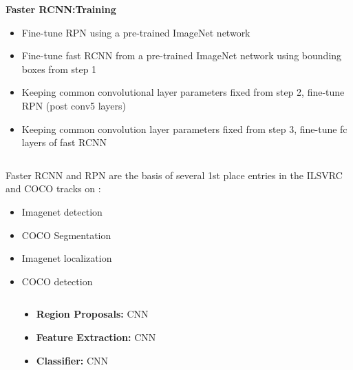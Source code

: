 \begin{frame}{}
	\begin{columns}
		
		\begin{overlayarea}{\textwidth}{\textheight}
			{\bf{\onslide<1->Faster RCNN:Training}}
			\begin{itemize}
				\justifying
				\item<2-> Fine-tune RPN using a pre-trained ImageNet network
				\item<3-> Fine-tune fast RCNN from a pre-trained ImageNet network using bounding boxes from step 1
				\item<4-> Keeping common convolutional layer parameters fixed from step 2,
				fine-tune RPN (post conv5 layers)
				\item <5->Keeping common convolution layer parameters fixed from step 3, fine-tune fc layers of fast RCNN 
			\end{itemize}
		\end{overlayarea}
	\end{columns}
\end{frame}

			
\begin{frame}
	\begin{block}
		 Faster RCNN and RPN are the basis of several 1st place entries in the ILSVRC and COCO tracks on :
		\begin{itemize}
			\justifying
			\item<2-> Imagenet detection 
			\item<3-> COCO Segmentation
			\item<4->Imagenet localization
			\item<5-> COCO detection
		\end{itemize}
	\end{block}
\end{frame}

			
\begin{frame}
	\begin{columns}
		\column{0.5\textwidth}
		\begin{overlayarea}{\textwidth}{\textheight}
			
			
		\end{overlayarea}
		\column{0.5\textwidth}
		\begin{overlayarea}{\textwidth}{\textheight}
			\begin{itemize}
				\item<2-> \textbf{Region Proposals:} CNN
				\item<3-> \textbf{Feature Extraction:} CNN
				\item<4-> \textbf{Classifier:} CNN
			\end{itemize}
		\end{overlayarea}
	\end{columns}
\end{frame}

